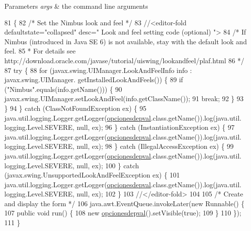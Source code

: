 \begin{DoxyParams}{Parameters}
{\em args} & the command line arguments \\
\hline
\end{DoxyParams}

\begin{DoxyCode}
81                                            \{
82         \textcolor{comment}{/* Set the Nimbus look and feel */}
83         \textcolor{comment}{//<editor-fold defaultstate="collapsed" desc=" Look and feel setting code (optional) ">}
84         \textcolor{comment}{/* If Nimbus (introduced in Java SE 6) is not available, stay with the default look and feel.}
85 \textcolor{comment}{         * For details see http://download.oracle.com/javase/tutorial/uiswing/lookandfeel/plaf.html }
86 \textcolor{comment}{         */}
87         \textcolor{keywordflow}{try} \{
88             \textcolor{keywordflow}{for} (javax.swing.UIManager.LookAndFeelInfo info : javax.swing.UIManager.
      getInstalledLookAndFeels()) \{
89                 \textcolor{keywordflow}{if} (\textcolor{stringliteral}{"Nimbus"}.equals(info.getName())) \{
90                     javax.swing.UIManager.setLookAndFeel(info.getClassName());
91                     \textcolor{keywordflow}{break};
92                 \}
93             \}
94         \} \textcolor{keywordflow}{catch} (ClassNotFoundException ex) \{
95             java.util.logging.Logger.getLogger(\mbox{\hyperlink{classsoftware_1_1opcionesdepval_aa861d1ccded1cb598792dc481db224c3}{opcionesdepval}}.class.getName()).log(java.util.
      logging.Level.SEVERE, null, ex);
96         \} \textcolor{keywordflow}{catch} (InstantiationException ex) \{
97             java.util.logging.Logger.getLogger(\mbox{\hyperlink{classsoftware_1_1opcionesdepval_aa861d1ccded1cb598792dc481db224c3}{opcionesdepval}}.class.getName()).log(java.util.
      logging.Level.SEVERE, null, ex);
98         \} \textcolor{keywordflow}{catch} (IllegalAccessException ex) \{
99             java.util.logging.Logger.getLogger(\mbox{\hyperlink{classsoftware_1_1opcionesdepval_aa861d1ccded1cb598792dc481db224c3}{opcionesdepval}}.class.getName()).log(java.util.
      logging.Level.SEVERE, null, ex);
100         \} \textcolor{keywordflow}{catch} (javax.swing.UnsupportedLookAndFeelException ex) \{
101             java.util.logging.Logger.getLogger(\mbox{\hyperlink{classsoftware_1_1opcionesdepval_aa861d1ccded1cb598792dc481db224c3}{opcionesdepval}}.class.getName()).log(java.util.
      logging.Level.SEVERE, null, ex);
102         \}
103         \textcolor{comment}{//</editor-fold>}
104 
105         \textcolor{comment}{/* Create and display the form */}
106         java.awt.EventQueue.invokeLater(\textcolor{keyword}{new} Runnable() \{
107             \textcolor{keyword}{public} \textcolor{keywordtype}{void} run() \{
108                 \textcolor{keyword}{new} \mbox{\hyperlink{classsoftware_1_1opcionesdepval_aa861d1ccded1cb598792dc481db224c3}{opcionesdepval}}().setVisible(\textcolor{keyword}{true});
109             \}
110         \});
111     \}
\end{DoxyCode}


